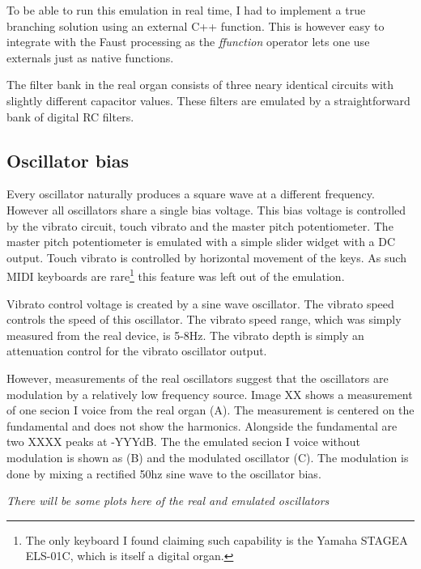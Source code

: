 \documentclass[11pt,a4paper]{article}
\begin{document}
To be able to run this emulation in real time, I had to implement a true branching solution using an external C++ function. This is however easy to integrate with the Faust processing as the \emph{ffunction} operator lets one use externals just as native functions.

The filter bank in the real organ consists of three neary identical circuits with slightly different capacitor values. These filters are emulated by a straightforward bank of digital RC filters\cite{rc-filter}.%

\subsection{Oscillator bias}
\label{section:oscillator-bias}

Every oscillator naturally produces a square wave at a different frequency. However all oscillators share a single bias voltage. This bias voltage is controlled by the vibrato circuit, touch vibrato and the master pitch potentiometer. The master pitch potentiometer is emulated with a simple slider widget with a DC output. Touch vibrato is controlled by horizontal movement of the keys. As such MIDI keyboards are rare\footnote{The only keyboard I found claiming such capability is the Yamaha STAGEA ELS-01C, which is itself a digital organ.} this feature was left out of the emulation.

Vibrato control voltage is created by a sine wave oscillator. The vibrato speed controls the speed of this oscillator. The vibrato speed range, which was simply measured from the real device, is 5-8Hz. The vibrato depth is simply an attenuation control for the vibrato oscillator output.

However, measurements of the real oscillators suggest that the oscillators are modulation by a relatively low frequency source. Image XX shows a measurement of one secion I voice from the real organ (A). The measurement is centered on the fundamental and does not show the harmonics. Alongside the fundamental are two XXXX peaks at -YYYdB. The the emulated secion I voice without modulation is shown as (B) and the modulated oscillator (C). The modulation is done by mixing a rectified 50hz sine wave to the oscillator bias.

\emph{There will be some plots here of the real and emulated oscillators}


\end{document}
